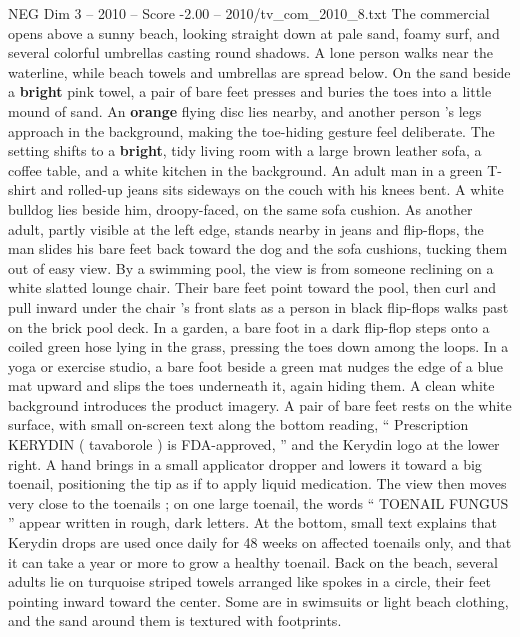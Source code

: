 \begin{textsample}{NEG Dim 3 – 2010 – Score -2.00 – 2010/tv\_com\_2010\_8.txt}  \label{ex:f3_neg_014}
The commercial opens above a sunny beach, looking straight down at pale sand, foamy surf, and several colorful umbrellas casting round shadows.
A lone person walks near the waterline, while beach towels and umbrellas are spread below.
On the sand beside a \textbf{bright} pink towel, a pair of bare feet presses and buries the toes into a little mound of sand.
An \textbf{orange} flying disc lies nearby, and another person ’s legs approach in the background, making the toe-hiding gesture feel deliberate.
The setting shifts to a \textbf{bright}, tidy living room with a large brown leather sofa, a coffee table, and a white kitchen in the background.
An adult man in a green T-shirt and rolled-up jeans sits sideways on the couch with his knees bent.
A white bulldog lies beside him, droopy-faced, on the same sofa cushion.
As another adult, partly visible at the left edge, stands nearby in jeans and flip-flops, the man slides his bare feet back toward the dog and the sofa cushions, tucking them out of easy view.
By a swimming pool, the view is from someone reclining on a white slatted lounge chair.
Their bare feet point toward the pool, then curl and pull inward under the chair ’s front slats as a person in black flip-flops walks past on the brick pool deck.
In a garden, a bare foot in a dark flip-flop steps onto a coiled green hose lying in the grass, pressing the toes down among the loops.
In a yoga or exercise studio, a bare foot beside a green mat nudges the edge of a blue mat upward and slips the toes underneath it, again hiding them.
A clean white background introduces the product imagery.
A pair of bare feet rests on the white surface, with small on-screen text along the bottom reading, “ Prescription KERYDIN ( tavaborole ) is FDA-approved, ” and the Kerydin logo at the lower right.
A hand brings in a small applicator dropper and lowers it toward a big toenail, positioning the tip as if to apply liquid medication.
The view then moves very close to the toenails ; on one large toenail, the words “ TOENAIL FUNGUS ” appear written in rough, dark letters.
At the bottom, small text explains that Kerydin drops are used once daily for 48 weeks on affected toenails only, and that it can take a year or more to grow a healthy toenail.
Back on the beach, several adults lie on turquoise striped towels arranged like spokes in a circle, their feet pointing inward toward the center.
Some are in swimsuits or light beach clothing, and the sand around them is textured with footprints.

\end{textsample}
